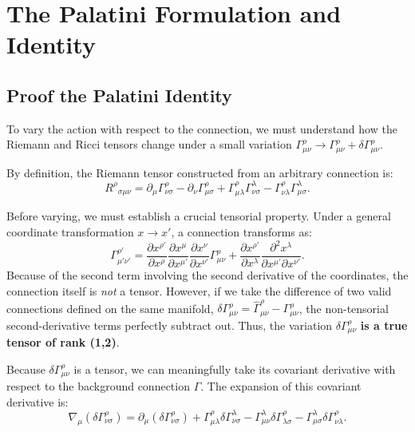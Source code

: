 \documentclass[11pt, a4paper]{report}
\begin{document}
\section{The Palatini Formulation and Identity}

\subsection{ Proof the Palatini Identity}

To vary the action with respect to the connection, we must understand how the Riemann and Ricci tensors change under a small variation $\Gamma^{\rho}_{\mu\nu} \to \Gamma^{\rho}_{\mu\nu} + \delta\Gamma^{\rho}_{\mu\nu}$. 

By definition, the Riemann tensor constructed from an arbitrary connection is:
\begin{equation}
\label{eq:riemann_def_gamma}
{R^{\rho}}_{\sigma\mu\nu} = \partial_{\mu}\Gamma^{\rho}_{\nu\sigma} - \partial_{\nu}\Gamma^{\rho}_{\mu\sigma} + \Gamma^{\rho}_{\mu\lambda}\Gamma^{\lambda}_{\nu\sigma} - \Gamma^{\rho}_{\nu\lambda}\Gamma^{\lambda}_{\mu\sigma}.
\end{equation}

Before varying, we must establish a crucial tensorial property. Under a general coordinate transformation $x \to x'$, a connection transforms as:
\begin{equation}
\Gamma^{\rho'}_{\mu'\nu'} = \frac{\partial x^{\rho'}}{\partial x^{\rho}} \frac{\partial x^{\mu}}{\partial x^{\mu'}} \frac{\partial x^{\nu}}{\partial x^{\nu'}} \Gamma^{\rho}_{\mu\nu} + \frac{\partial x^{\rho'}}{\partial x^{\lambda}} \frac{\partial^{2} x^{\lambda}}{\partial x^{\mu'} \partial x^{\nu'}}.
\end{equation}
Because of the second term involving the second derivative of the coordinates, the connection itself is \textit{not} a tensor. However, if we take the difference of two valid connections defined on the same manifold, $\delta\Gamma^{\rho}_{\mu\nu} = \hat{\Gamma}^{\rho}_{\mu\nu} - \Gamma^{\rho}_{\mu\nu}$, the non-tensorial second-derivative terms perfectly subtract out. Thus, the variation $\delta\Gamma^{\rho}_{\mu\nu}$ \textbf{is a true tensor of rank (1,2)}. 

Because $\delta\Gamma^{\rho}_{\mu\nu}$ is a tensor, we can meaningfully take its covariant derivative with respect to the background connection $\Gamma$. The expansion of this covariant derivative is:
\begin{equation}
\label{eq:cov_deriv_delta_gamma}
\nabla_{\mu}(\delta\Gamma^{\rho}_{\nu\sigma}) = \partial_{\mu}(\delta\Gamma^{\rho}_{\nu\sigma}) + \Gamma^{\rho}_{\mu\lambda}\delta\Gamma^{\lambda}_{\nu\sigma} - \Gamma^{\lambda}_{\mu\nu}\delta\Gamma^{\rho}_{\lambda\sigma} - \Gamma^{\lambda}_{\mu\sigma}\delta\Gamma^{\rho}_{\nu\lambda}.
\end{equation}
\end{document}
